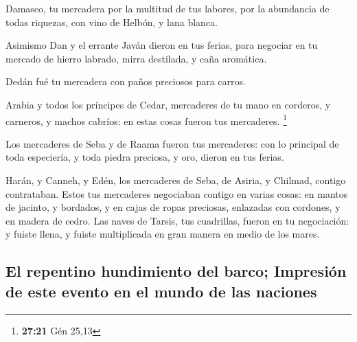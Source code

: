  Damasco, tu mercadera por la multitud de tus labores, por
la abundancia de todas riquezas, con vino de Helbón, y lana blanca.

 Asimismo Dan y el errante Javán dieron en tus ferias, para
negociar en tu mercado de hierro labrado, mirra destilada, y caña
aromática.

 Dedán fué tu mercadera con paños preciosos para carros.

 Arabia y todos los príncipes de Cedar, mercaderes de tu
mano en corderos, y carneros, y machos cabríos: en estas cosas fueron
tus mercaderes. \footnote{\textbf{27:21} Gén 25,13}

 Los mercaderes de Seba y de Raama fueron tus mercaderes:
con lo principal de toda especiería, y toda piedra preciosa, y oro,
dieron en tus ferias.

 Harán, y Canneh, y Edén, los mercaderes de Seba, de
Asiria, y Chilmad, contigo contrataban.  Estos tus
mercaderes negociaban contigo en varias cosas: en mantos de jacinto, y
bordados, y en cajas de ropas preciosas, enlazadas con cordones, y en
madera de cedro.  Las naves de Tarsis, tus cuadrillas,
fueron en tu negociación: y fuiste llena, y fuiste multiplicada en gran
manera en medio de los mares.

\hypertarget{el-repentino-hundimiento-del-barco-impresiuxf3n-de-este-evento-en-el-mundo-de-las-naciones}{%
\subsection{El repentino hundimiento del barco; Impresión de este evento
en el mundo de las
naciones}\label{el-repentino-hundimiento-del-barco-impresiuxf3n-de-este-evento-en-el-mundo-de-las-naciones}}

